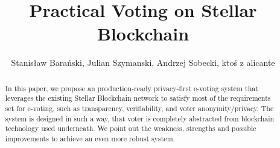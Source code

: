 \documentclass[runningheads]{llncs}
\begin{document}
%
\title{Practical Voting on Stellar Blockchain}
%
%
\author{Stanisław Barański, Julian Szymanski, Andrzej Sobecki, ktoś z alicante}

%
%
\maketitle              %
%
\begin{abstract}
In this paper, we propose  an production-ready privacy-first e-voting system that leverages the existing Stellar Blockchain network to satisfy most of the requirements set for e-voting, such as transparency, verifiability, and voter anonymity/privacy. The system is designed in such a way, that voter is completely abstracted from blockchain technology used underneath. We point out the weakness, strengths and possible improvements to achieve an even more robust system. 


\end{abstract}
\end{document}
